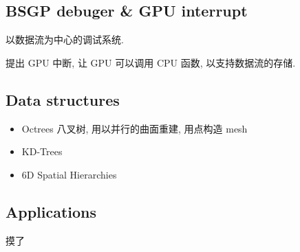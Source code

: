 \subsection{BSGP debuger \& GPU interrupt}
以数据流为中心的调试系统. 

提出 GPU 中断, 让 GPU 可以调用 CPU 函数, 以支持数据流的存储. 


\subsection{Data structures}
\begin{itemize}
    \item Octrees 八叉树, 用以并行的曲面重建, 用点构造 mesh
    \item KD-Trees
    \item 6D Spatial Hierarchies
\end{itemize}
\subsection{Applications}
摸了